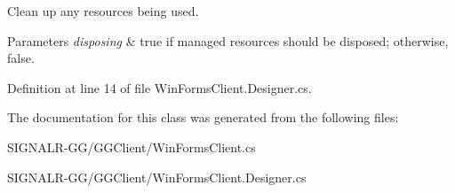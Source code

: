 Clean up any resources being used. 


\begin{DoxyParams}{Parameters}
{\em disposing} & true if managed resources should be disposed; otherwise, false.\\
\hline
\end{DoxyParams}


Definition at line 14 of file Win\+Forms\+Client.\+Designer.\+cs.



The documentation for this class was generated from the following files\+:\begin{DoxyCompactItemize}
\item 
S\+I\+G\+N\+A\+L\+R-\/\+G\+G/\+G\+G\+Client/Win\+Forms\+Client.\+cs\item 
S\+I\+G\+N\+A\+L\+R-\/\+G\+G/\+G\+G\+Client/Win\+Forms\+Client.\+Designer.\+cs\end{DoxyCompactItemize}
